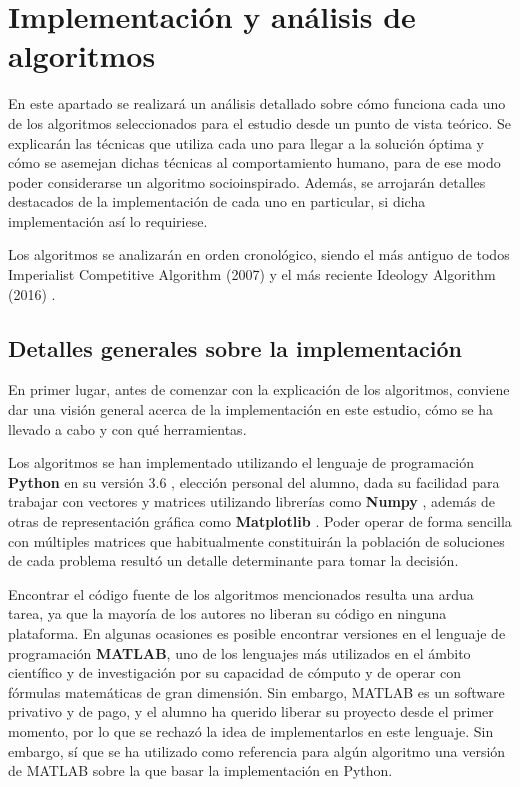 \chapter{Implementación y análisis de algoritmos}

En este apartado se realizará un análisis detallado sobre cómo funciona cada uno de los algoritmos seleccionados para el estudio desde un punto de vista teórico. Se explicarán las técnicas que utiliza cada uno para llegar a la solución óptima y cómo se asemejan dichas técnicas al comportamiento humano, para de ese modo poder considerarse un algoritmo socioinspirado. Además, se arrojarán detalles destacados de la implementación de cada uno en particular, si dicha implementación así lo requiriese.

Los algoritmos se analizarán en orden cronológico, siendo el más antiguo de todos Imperialist Competitive Algorithm (2007) \cite{ica-conference} y el más reciente Ideology Algorithm (2016) \cite{ia-article}.

\section{Detalles generales sobre la implementación}

En primer lugar, antes de comenzar con la explicación de los algoritmos, conviene dar una visión general acerca de la implementación en este estudio, cómo se ha llevado a cabo y con qué herramientas.

Los algoritmos se han implementado utilizando el lenguaje de programación \textbf{Python} en su versión 3.6 \cite{python-3.6-doc}, elección personal del alumno, dada su facilidad para trabajar con vectores y matrices utilizando librerías como \textbf{Numpy} \cite{numpy-doc}, además de otras de representación gráfica como \textbf{Matplotlib} \cite{matplotlib-doc}. Poder operar de forma sencilla con múltiples matrices que habitualmente constituirán la población de soluciones de cada problema resultó un detalle determinante para tomar la decisión.

Encontrar el código fuente de los algoritmos mencionados resulta una ardua tarea, ya que la mayoría de los autores no liberan su código en ninguna plataforma. En algunas ocasiones es posible encontrar versiones en el lenguaje de programación \textbf{MATLAB}, uno de los lenguajes más utilizados en el ámbito científico y de investigación por su capacidad de cómputo y de operar con fórmulas matemáticas de gran dimensión. Sin embargo, MATLAB es un software privativo y de pago, y el alumno ha querido liberar su proyecto desde el primer momento, por lo que se rechazó la idea de implementarlos en este lenguaje. Sin embargo, sí que se ha utilizado como referencia para algún algoritmo una versión de MATLAB sobre la que basar la implementación en Python.

